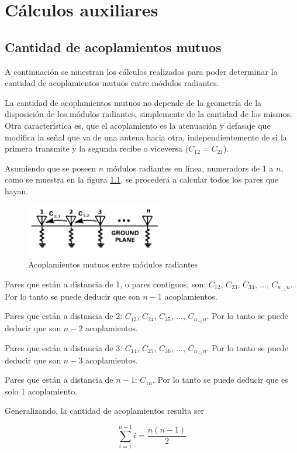 
\chapter{Cálculos auxiliares} %

\label{AppendixA} %


\section{Cantidad de acoplamientos mutuos}

A continuación se muestran los cálculos realizados para poder determinar la cantidad de acoplamientos mutuos entre módulos
radiantes.

La cantidad de acoplamientos mutuos no depende de la geometría de la disposición de los módulos radiantes, simplemente de 
la cantidad de los mismos. Otra característica es, que el acoplamiento es la atenuación y defasaje que modifica la señal 
que va de una antena hacia otra, independientemente de si la primera transmite y la segunda recibe o viceversa 
($C_{12} = C_{21}$).

Asumiendo que se poseen $n$ módulos radiantes en línea, numeradors de 1 a $n$, como se muestra en la figura \ref{fig:RmsInARow},
se procederá a calcular todos los pares que hayan. 

\begin{figure}[H]
 \centering
 \includegraphics[width=6cm]{gfx/mutualCoupling.png}
 \caption{Acoplamientos mutuos entre módulos radiantes}
 \label{fig:RmsInARow}
\end{figure}

Pares que están a distancia de 1, o pares contiguos, son: $C_{12}$, $C_{23}$, $C_{34}$, ..., $C_{n_{-1}n}$. Por lo tanto se puede deducir
que son $n - 1$ acoplamientos.

Pares que están a distancia de 2: $C_{13}$, $C_{24}$, $C_{35}$, ..., $C_{n_{-2}n}$. Por lo tanto se puede deducir que son $n - 2$ acoplamientos.

Pares que están a distancia de 3: $C_{14}$, $C_{25}$, $C_{36}$, ..., $C_{n_{-3}n}$. Por lo tanto se puede deducir que son $n - 3$ acoplamientos.

Pares que están a distancia de $n - 1$: $C_{1n}$. Por lo tanto se puede deducir que es solo 1 acoplamiento. 

Generalizando, la cantidad de acoplamientos resulta ser 

\begin{equation}\label{eq:amountMutCoupling}
	\sum_{i = 1}^{n-1} i = \dfrac{n(n-1)}{2}
\end{equation}
